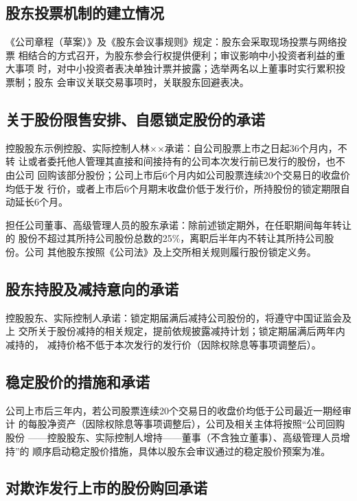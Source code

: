 \subsection{股东投票机制的建立情况}

《公司章程（草案）》及《股东会议事规则》规定：股东会采取现场投票与网络投票
相结合的方式召开，为股东参会行权提供便利；审议影响中小投资者利益的重大事项
时，对中小投资者表决单独计票并披露；选举两名以上董事时实行累积投票制；股东
会审议关联交易事项时，关联股东回避表决。


\subsection{关于股份限售安排、自愿锁定股份的承诺}

控股股东示例控股、实际控制人林××承诺：自公司股票上市之日起36个月内，不转
让或者委托他人管理其直接和间接持有的公司本次发行前已发行的股份，也不由公司
回购该部分股份；公司上市后6个月内如公司股票连续20个交易日的收盘价均低于发
行价，或者上市后6个月期末收盘价低于发行价，所持股份的锁定期限自动延长6个月。

担任公司董事、高级管理人员的股东承诺：除前述锁定期外，在任职期间每年转让的
股份不超过其所持公司股份总数的25\%，离职后半年内不转让其所持公司股份。公司
其他股东按照《公司法》及上交所相关规则履行股份锁定义务。

\subsection{股东持股及减持意向的承诺}

控股股东、实际控制人承诺：锁定期届满后减持公司股份的，将遵守中国证监会及上
交所关于股份减持的相关规定，提前依规披露减持计划；锁定期届满后两年内减持的，
减持价格不低于本次发行的发行价（因除权除息等事项调整后）。

\subsection{稳定股价的措施和承诺}

公司上市后三年内，若公司股票连续20个交易日的收盘价均低于公司最近一期经审计
的每股净资产（因除权除息等事项调整后），公司及相关主体将按照``公司回购股份
——控股股东、实际控制人增持——董事（不含独立董事）、高级管理人员增持''的
顺序启动稳定股价措施，具体以股东会审议通过的稳定股价预案为准。

\subsection{对欺诈发行上市的股份购回承诺}

